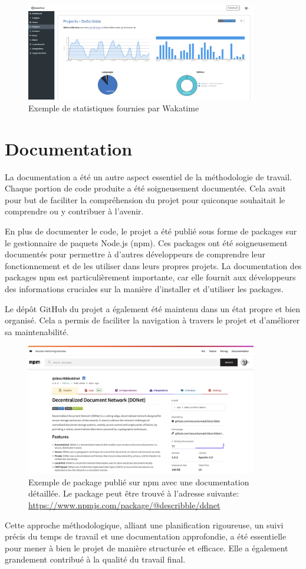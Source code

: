 \begin{figure}[H]
    \centering
    \includegraphics[width=0.9\textwidth]{assets/figures/wakatime.png}
    \caption{Exemple de statistiques fournies par Wakatime}
\end{figure}

\section{Documentation}

La documentation a été un autre aspect essentiel de la méthodologie de travail. Chaque portion de code produite a été soigneusement documentée. Cela avait pour but de faciliter la compréhension du projet pour quiconque souhaitait le comprendre ou y contribuer à l'avenir.

En plus de documenter le code, le projet a été publié sous forme de packages sur le gestionnaire de paquets Node.js (npm). Ces packages ont été soigneusement documentés pour permettre à d'autres développeurs de comprendre leur fonctionnement et de les utiliser dans leurs propres projets. La documentation des packages npm est particulièrement importante, car elle fournit aux développeurs des informations cruciales sur la manière d'installer et d'utiliser les packages.

Le dépôt GitHub du projet a également été maintenu dans un état propre et bien organisé. Cela a permis de faciliter la navigation à travers le projet et d'améliorer sa maintenabilité.

\begin{figure}[H]
    \centering
    \includegraphics[width=0.9\textwidth]{assets/figures/npm-package.png}
    \caption{Exemple de package publié sur npm avec une documentation détaillée. Le package peut être trouvé à l'adresse suivante: \url{https://www.npmjs.com/package/@describble/ddnet}}
\end{figure}

Cette approche méthodologique, alliant une planification rigoureuse, un suivi précis du temps de travail et une documentation approfondie, a été essentielle pour mener à bien le projet de manière structurée et efficace. Elle a également grandement contribué à la qualité du travail final.